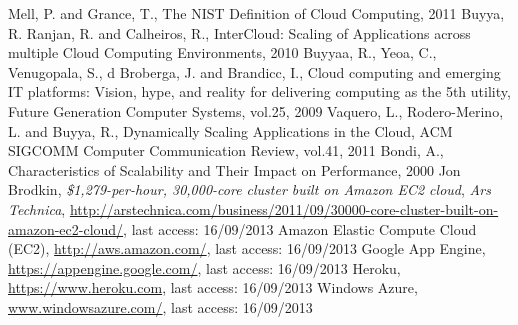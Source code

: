 \documentclass[twocolumn]{svjour3}          %
\begin{document}
\begin{thebibliography}{}
%
%
  {Mell, P. and Grance, T.}, {The NIST Definition of Cloud Computing}, 2011
  {Buyya, R. Ranjan, R. and Calheiros, R.}, {InterCloud: Scaling of Applications across multiple Cloud Computing Environments}, 2010
  {Buyyaa, R., Yeoa, C., Venugopala, S., d Broberga, J. and Brandicc, I.}, {Cloud computing and emerging IT platforms: Vision, hype, and reality for delivering computing as the 5th utility}, {Future Generation Computer Systems}, vol.25, 2009
  {Vaquero, L., Rodero-Merino, L. and Buyya, R.}, {Dynamically Scaling Applications in the Cloud}, {ACM SIGCOMM Computer Communication Review}, vol.41, 2011
  Bondi, A., {Characteristics of Scalability and Their Impact on Performance}, 2000
  Jon Brodkin, \emph{\$1,279-per-hour, 30,000-core cluster built on Amazon EC2 cloud}, {\emph{Ars Technica}, \url{http://arstechnica.com/business/2011/09/30000-core-cluster-built-on-amazon-ec2-cloud/}}, last access: 16/09/2013
  {Amazon Elastic Compute Cloud (EC2)}, {\url{http://aws.amazon.com/}}, last access: 16/09/2013 
  {Google App Engine}, {\url{https://appengine.google.com/}}, last access: 16/09/2013 
  {Heroku}, {\url{https://www.heroku.com}}, last access: 16/09/2013 
  {Windows Azure}, {\url{www.windowsazure.com/}}, last access: 16/09/2013 
\end{thebibliography}
\end{document}
